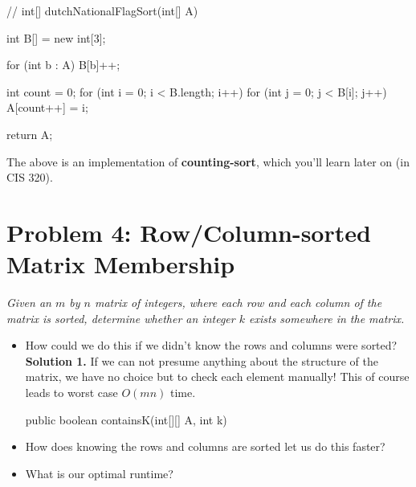 \begin{java}
    //
    int[] dutchNationalFlagSort(int[] A) {
        int B[] = new int[3];

        for (int b : A) {
            B[b]++;
        }

        int count = 0;
        for (int i = 0; i < B.length; i++) {
            for (int j = 0; j < B[i]; j++) {
                A[count++] = i;
            }
        }

        return A;
    }
\end{java}

The above is an implementation of \textbf{counting-sort}, which you'll learn later on (in CIS 320).

\section*{Problem 4: Row/Column-sorted Matrix Membership}
\textit{Given an $m$ by $n$ matrix of integers, where each row and each column of the matrix is sorted, determine whether an integer $k$ exists somewhere in the matrix.}
\begin{itemize}
    \item How could we do this if we didn't know the rows and columns were sorted?\\
    
    \textbf{Solution 1.} If we can not presume anything about the structure of the matrix, we have no choice but to check each element manually! This of course leads to worst case $O(mn)$ time.

    \begin{java}
        public boolean containsK(int[][] A, int k) {

        }
    \end{java}

    \item How does knowing the rows and columns are sorted let us do this faster?
    \item What is our optimal runtime?
\end{itemize}
    

